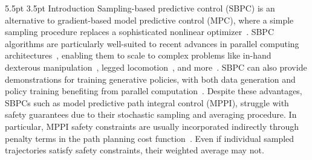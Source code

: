 \documentclass[letterpaper, 10 pt, conference]{ieeeconf}
\makeatletter
\renewcommand{\section}{%
  \@startsection{section}{1}{\z@}%
  {5.5pt}%
  {3.5pt}%
  {\normalfont\normalsize\centering\scshape}}
\makeatother
\begin{document}
\section{Introduction}
Sampling-based predictive control (SBPC) is an alternative to gradient-based model predictive control (MPC), where a simple sampling procedure replaces a sophisticated nonlinear optimizer~\cite{howell2022predictive}. SBPC algorithms are particularly well-suited to recent advances in parallel computing architectures~\cite{mjx}, enabling them to scale to complex problems like in-hand dexterous manipulation~\cite{li2025drop}, legged locomotion~\cite{alvarez2025real}, and more~\cite{howell2022predictive}. 
SBPC can also provide demonstrations for training generative policies, with both data generation and policy training benefiting from parallel computation~\cite{Kurtz_GPC}.
Despite these advantages, SBPCs such as model predictive path integral control (MPPI), struggle with safety guarantees due to their stochastic sampling and averaging procedure. In particular, MPPI safety constraints are usually incorporated indirectly through penalty terms in the path planning cost function~\cite{williams2017model, yin2023shield}. Even if individual sampled trajectories satisfy safety constraints, their weighted average may not. 
\end{document}

